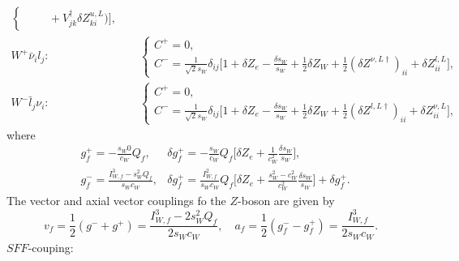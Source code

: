 \begin{eqnarray}
\begin{cases}
\quad\quad+V_{jk}^\dagger\delta Z^{u,L}_{ki})\biggr],
\end{cases}\nonumber\\
W^+\bar{\nu}_il_j:&&
\begin{cases}
C^+=0,\\
C^-=\frac{1}{\sqrt{2}s_W}\delta_{ij}\biggl[ 1+\delta Z_e-\frac{\delta s_W}{s_W}+\frac{1}{2}\delta Z_W+\frac{1}{2}(\delta Z^{\nu,L\dagger})_{ii}+\delta Z^{l,L}_{ii} \biggr],
\end{cases}\nonumber\\
W^-\bar{l}_j\nu_i:&&
\begin{cases}
C^+=0,\\
C^-=\frac{1}{\sqrt{2}s_W}\delta_{ij}\biggl[ 1+\delta Z_e-\frac{\delta s_W}{s_W}+\frac{1}{2}\delta Z_W+\frac{1}{2}(\delta Z^{l,L\dagger})_{ii}+\delta Z^{\nu,L}_{ii} \biggr],
\end{cases}
\end{eqnarray}
where
\begin{eqnarray}
&g^+_f=-\frac{s_W0}{c_W}Q_f,&\delta g^+_f=-\frac{s_W}{c_W}Q_f\biggl[ \delta Z_e+\frac{1}{c_W^2}\frac{\delta s_W}{s_W} \biggr],\nonumber\\
&g^-_f=\frac{I^3_{W,f}-s^2_WQ_f}{s_Wc_W},&\delta g^+_f=\frac{I^2_{W,f}}{s_Wc_W}Q_f\biggl[ \delta Z_e+\frac{s^2_W-c^2_W}{c_W^2}\frac{\delta s_W}{s_W} \biggr]+\delta g^+_f.
\end{eqnarray}
The vector and axial vector couplings fo the $Z$-boson are given by
\begin{equation}
v_f=\frac{1}{2}(g^-+g^+)=\frac{I^3_{W,f}-2s_W^2Q_f}{2s_Wc_W},\quad a_f=\frac{1}{2}(g^-_f-g^+_f)=\frac{I^3_{W,f}}{2s_Wc_W}.
\end{equation}
\newpage
$SFF$-couping:

